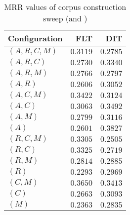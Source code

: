 
\begin{table}
\begin{spacing}{1.2}
\centering
\caption{MRR values of \mahout corpus construction sweep (\cone and \ctwo)}
\label{table:mahout_corpus_sweep}
\vspace{0.2em}
\begin{tabular}{lrr}
\toprule
Configuration &           FLT &           DIT \\
\midrule
  $(A,R,C,M)$ &      $0.3119$ &      $0.2785$ \\
    $(A,R,C)$ &      $0.2730$ &      $0.3340$ \\
    $(A,R,M)$ &      $0.2766$ &      $0.2797$ \\
      $(A,R)$ &      $0.2606$ &      $0.3052$ \\
    $(A,C,M)$ &      $0.3422$ &      $0.3124$ \\
      $(A,C)$ &      $0.3063$ &      $0.3492$ \\
      $(A,M)$ &      $0.2799$ &      $0.3116$ \\
        $(A)$ &      $0.2601$ & $\bm{0.3827}$ \\
    $(R,C,M)$ &      $0.3305$ &      $0.2505$ \\
      $(R,C)$ &      $0.3325$ &      $0.2719$ \\
      $(R,M)$ &      $0.2814$ &      $0.2885$ \\
        $(R)$ &      $0.2293$ &      $0.2969$ \\
      $(C,M)$ & $\bm{0.3650}$ &      $0.3413$ \\
        $(C)$ &      $0.2663$ &      $0.3093$ \\
        $(M)$ &      $0.2363$ &      $0.2835$ \\
\bottomrule
\end{tabular}

\end{spacing}
\end{table}
